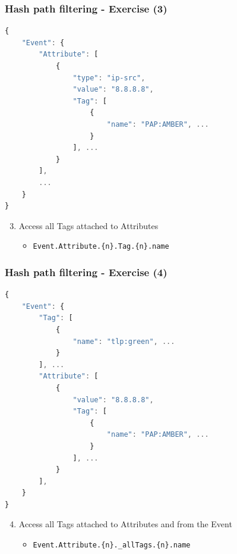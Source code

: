 \begin{frame}[fragile]
    \frametitle{Hash path filtering - Exercise (3)}

\begin{lstlisting}[language=javascript,firstnumber=1]
{
    "Event": {
        "Attribute": [
            {
                "type": "ip-src",
                "value": "8.8.8.8",
                "Tag": [
                    {
                        "name": "PAP:AMBER", ...
                    }
                ], ...
            }
        ],
        ...
    }
}
\end{lstlisting}
    \begin{enumerate}
        \setcounter{enumi}{2}
        \item Access all Tags attached to Attributes
        \pause
        \begin{itemize}
            \item \texttt{Event.Attribute.\{n\}.Tag.\{n\}.name}
        \end{itemize}
    \end{enumerate}
\end{frame}

\begin{frame}[fragile]
    \frametitle{Hash path filtering - Exercise (4)}

\begin{lstlisting}[language=javascript,firstnumber=1]
{
    "Event": {
        "Tag": [
            {
                "name": "tlp:green", ...
            }
        ], ...
        "Attribute": [
            {
                "value": "8.8.8.8",
                "Tag": [
                    {
                        "name": "PAP:AMBER", ...
                    }
                ], ...
            }
        ],
    }
}
\end{lstlisting}
    \begin{enumerate}
        \setcounter{enumi}{3}
        \item Access all Tags attached to Attributes and from the Event
        \pause
        \begin{itemize}
            \item \texttt{Event.Attribute.\{n\}.\_allTags.\{n\}.name}
        \end{itemize}
    \end{enumerate}
\end{frame}

